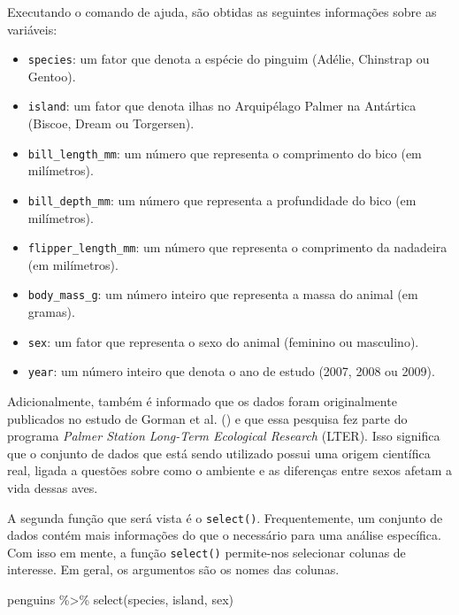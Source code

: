 \documentclass[
  12pt,
  letterpaper,
  DIV=11,
  numbers=noendperiod]{scrreprt}
\newenvironment{Shaded}{\begin{snugshade}}{\end{snugshade}}
\newcommand{\FunctionTok}[1]{\textcolor[rgb]{0.28,0.35,0.67}{#1}}
\newcommand{\NormalTok}[1]{\textcolor[rgb]{0.00,0.23,0.31}{#1}}
\newcommand{\SpecialCharTok}[1]{\textcolor[rgb]{0.37,0.37,0.37}{#1}}
\providecommand{\tightlist}{%
  \setlength{\itemsep}{0pt}\setlength{\parskip}{0pt}}\usepackage{longtable,booktabs,array}
\theoremstyle{definition}
\theoremstyle{exemplo}
\begin{document}
Executando o comando de ajuda, são obtidas as seguintes informações
sobre as variáveis:

\begin{itemize}
\tightlist
\item
  \texttt{species}: um fator que denota a espécie do pinguim (Adélie,
  Chinstrap ou Gentoo).
\item
  \texttt{island}: um fator que denota ilhas no Arquipélago Palmer na
  Antártica (Biscoe, Dream ou Torgersen).
\item
  \texttt{bill\_length\_mm}: um número que representa o comprimento do
  bico (em milímetros).
\item
  \texttt{bill\_depth\_mm}: um número que representa a profundidade do
  bico (em milímetros).
\item
  \texttt{flipper\_length\_mm}: um número que representa o comprimento
  da nadadeira (em milímetros).
\item
  \texttt{body\_mass\_g}: um número inteiro que representa a massa do
  animal (em gramas).
\item
  \texttt{sex}: um fator que representa o sexo do animal (feminino ou
  masculino).
\item
  \texttt{year}: um número inteiro que denota o ano de estudo (2007,
  2008 ou 2009).
\end{itemize}

Adicionalmente, também é informado que os dados foram originalmente
publicados no estudo de Gorman et al.
() e que essa
pesquisa fez parte do programa \emph{Palmer Station Long-Term Ecological
Research} (LTER). Isso significa que o conjunto de dados que está sendo
utilizado possui uma origem científica real, ligada a questões sobre
como o ambiente e as diferenças entre sexos afetam a vida dessas aves.

A segunda função que será vista é o \texttt{select()}. Frequentemente,
um conjunto de dados contém mais informações do que o necessário para
uma análise específica. Com isso em mente, a função \texttt{select()}
permite-nos selecionar colunas de interesse. Em geral, os argumentos são
os nomes das colunas.

\begin{Shaded}
\begin{Highlighting}[]
\NormalTok{penguins }\SpecialCharTok{\%\textgreater{}\%} 
  \FunctionTok{select}\NormalTok{(species, island, sex)}
\end{Highlighting}
\end{Shaded}
\end{document}

